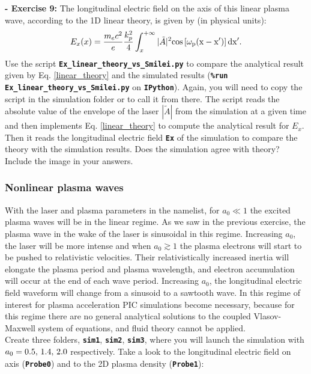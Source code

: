 \documentclass[a4paper,12pt]{extarticle}
\newcommand{\commandline}[1]{\texttt{\textbf{#1}}}
\begin{document}
\textbf{ - Exercise 9:} The longitudinal electric field on the axis of this linear plasma wave, according to the 1D linear theory, is given by (in physical units):
\begin{equation}\label{linear_theory}
E_x(x) = \frac{m_e c^2}{e}\frac{k_p^2}{4} \int_x^{+\infty} |\tilde{A}|^2\rm{cos}\left[\omega_p(x-x')\right]dx'.\\
\end{equation}
Use the script \commandline{Ex\_linear\_theory\_vs\_Smilei.py} to compare the analytical result given by Eq. \ref{linear_theory} and the simulated results (\commandline{\%run Ex\_linear\_theory\_vs\_Smilei.py} on \commandline{IPython}). Again, you will need to copy the script in the simulation folder or to call it from there. The script reads the absolute value of the envelope of the laser $|\tilde{A}|$ from the simulation at a given time and then implements Eq. \ref{linear_theory} to compute the analytical result for $E_x$. Then it reads the longitudinal electric field \commandline{Ex} of the simulation to compare the theory with the simulation results. Does the simulation agree with theory? Include the image in your answers.

\subsubsection {Nonlinear plasma waves}
With the laser and plasma parameters in the namelist, for $a_0\ll1$ the excited plasma waves will be in the linear regime. As we saw in the previous exercise, the plasma wave in the wake of  the laser is sinusoidal in this regime.
Increasing $a_0$, the laser will be more intense and when $a_0\gtrsim1$ the plasma electrons will start to  be pushed to relativistic velocities. Their relativistically increased inertia will elongate the plasma period and plasma wavelength, and electron accumulation will occur at the end of each wave period. Increasing $a_0$, the longitudinal electric field waveform will change from a sinusoid to a sawtooth wave. In this regime of interest for plasma acceleration PIC simulations become necessary, because for this regime there are no general analytical solutions to the coupled Vlasov-Maxwell system of equations,  and fluid theory cannot be applied.\\

Create three folders, \commandline{sim1}, \commandline{sim2}, \commandline{sim3}, where you will launch the simulation  with $a_0=0.5,\thinspace 1.4,\thinspace 2.0$ respectively. Take a look to the longitudinal electric field on axis (\commandline{Probe0}) and to the 2D plasma density (\commandline{Probe1}):\\
\end{document}
